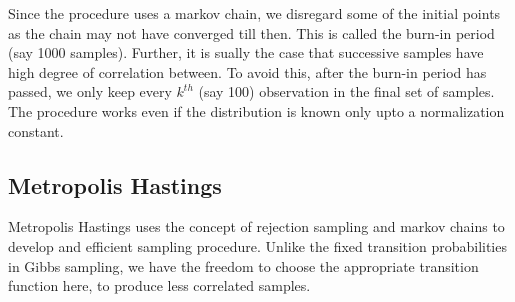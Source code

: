 \documentclass[../../statistical_learning_notes.tex]{subfiles}
\begin{document}
Since the procedure uses a markov chain, we disregard some of the initial points as the chain may not have converged till then. This is called the burn-in period (say 1000 samples). Further, it is sually the case that successive samples have high degree of correlation between. To avoid this, after the burn-in period has passed, we only keep every $k^{th}$ (say 100) observation in the final set of samples. The procedure works even if the distribution is known only upto a normalization constant.


\subsection{Metropolis Hastings}
Metropolis Hastings uses the concept of rejection sampling and markov chains to develop and efficient sampling procedure. Unlike the fixed transition probabilities in Gibbs sampling, we have the freedom to choose the appropriate transition function here, to produce less correlated samples.
\end{document}
